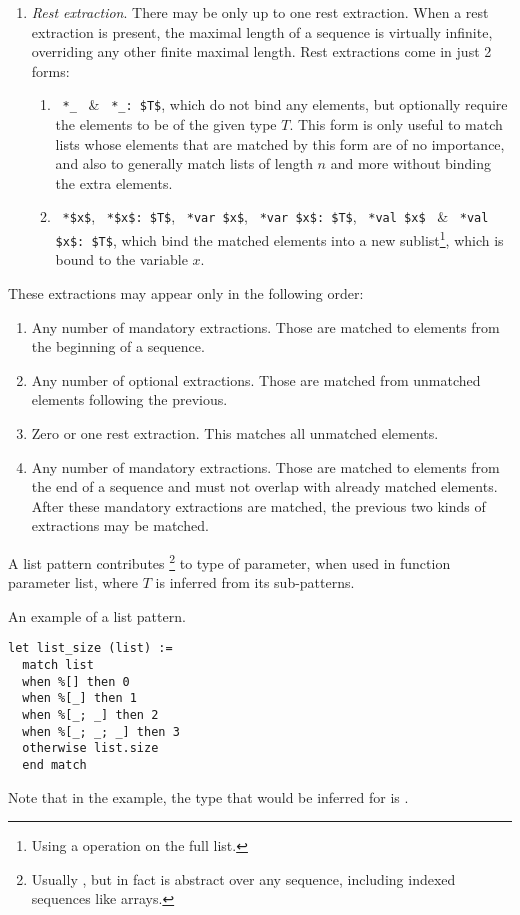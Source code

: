 \begin{enumerate}
\begin{enumerate}
    \end{enumerate}
  \item {\em Rest extraction}. There may be only up to one rest extraction. When a rest extraction is present, the maximal length of a sequence is virtually infinite, overriding any other finite maximal length. Rest extractions come in just 2 forms:
    \begin{enumerate}
      \item ~\lstinline!*_!~ \& ~\lstinline!*_: $T$!, which do not bind any elements, but optionally require the elements to be of the given type $T$. This form is only useful to match lists whose elements that are matched by this form are of no importance, and also to generally match lists of length $n$ and more without binding the extra elements. 
      \item ~\lstinline!*$x$!, ~\lstinline!*$x$: $T$!, ~\lstinline!*var $x$!, ~\lstinline!*var $x$: $T$!, ~\lstinline!*val $x$!~ \& ~\lstinline!*val $x$: $T$!, which bind the matched elements into a new sublist\footnote{Using a  operation on the full list.}, which is bound to the variable $x$. 
    \end{enumerate}
\end{enumerate}

These extractions may appear only in the following order:
\begin{enumerate}
  \item Any number of mandatory extractions. Those are matched to elements from the beginning of a sequence. 
  \item Any number of optional extractions. Those are matched from unmatched elements following the previous. 
  \item Zero or one rest extraction. This matches all unmatched elements. 
  \item Any number of mandatory extractions. Those are matched to elements from the end of a sequence and must not overlap with already matched elements. After these mandatory extractions are matched, the previous two kinds of extractions may be matched. 
\end{enumerate}

A list pattern contributes \footnote{Usually , but in fact is abstract over any sequence, including indexed sequences like arrays.} to type of parameter, when used in function parameter list, where $T$ is inferred from its sub-patterns. 

\example An example of a list pattern.
\begin{lstlisting}
let list_size (list) := 
  match list 
  when %[] then 0
  when %[_] then 1
  when %[_; _] then 2
  when %[_; _; _] then 3
  otherwise list.size
  end match
\end{lstlisting}
Note that in the example, the type that would be inferred for  is . 




